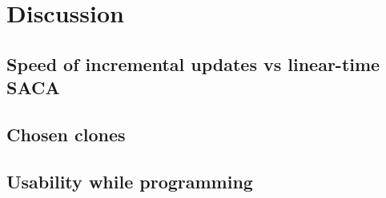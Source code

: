 \chapter{Discussion}

\section{Speed of incremental updates vs linear-time SACA}

\section{Chosen clones}

\section{Usability while programming}
